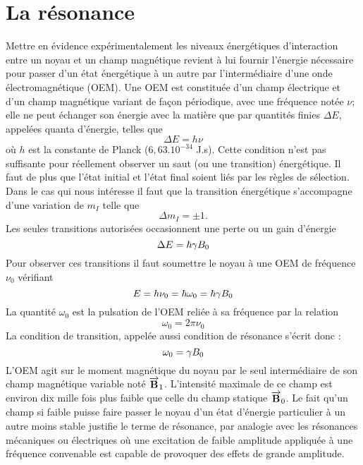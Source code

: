 \section{La résonance}
Mettre en évidence expérimentalement les niveaux énergétiques d'interaction
entre un noyau et un champ magnétique revient à lui fournir l'énergie nécessaire pour
passer d'un état énergétique à un autre par l'intermédiaire d'une onde
électromagnétique (OEM).
Une OEM est constituée d'un champ électrique et d'un champ magnétique
variant de façon périodique, avec une fréquence notée $\nu$; elle ne peut échanger son
énergie avec la matière que par quantités finies $\Delta E$, appelées quanta
d'énergie, telles que
\begin{equation}
\Delta E = h \nu
\end{equation}
où $h$ est la constante de Planck ($6,63.10^{-34}$ J.s).
Cette condition n'est pas suffisante pour
réellement observer un saut (ou une transition) énergétique.
Il faut de plus que l'état initial et l'état final soient liés par les règles
de sélection.
Dans le cas qui nous intéresse il
faut que la transition énergétique s'accompagne d'une variation de $m_I$
telle que
\begin{equation}
\Delta m_I = \pm 1.
\end{equation}
Les seules transitions autorisées occasionnent une perte ou un gain d'énergie
\begin{equation}
\Delta E = \hbar \gamma B_0
\end{equation}
Pour observer ces
transitions il faut soumettre le noyau à une OEM de fréquence $\nu_0$ vérifiant
\begin{equation}
E = h \nu_0 = \hbar \omega_0 = \hbar \gamma B_0
\end{equation}
La quantité $\omega_0$ est la pulsation de l'OEM reliée à sa fréquence par
la relation
\begin{equation}
\omega_0 = 2 \pi \nu_0
\end{equation}
La condition de transition, appelée aussi condition de résonance s'écrit donc :
\begin{equation}
\label{equbase}
\omega_0 = \gamma B_0
\end{equation}
L'OEM agit sur le moment magnétique du noyau par le seul intermédiaire de son
champ magnétique variable noté $\overrightarrow{\mathbf{B}}_1$.
L'intensité maximale de ce champ est environ dix mille
fois plus faible que celle du champ statique $\overrightarrow{\mathbf{B}}_0$.
Le fait qu'un champ si faible puisse faire passer le
noyau d'un état d'énergie particulier à un autre moins stable justifie le terme de
résonance, par analogie avec les résonances mécaniques ou électriques
où une excitation de faible amplitude appliquée à une fréquence convenable
est capable de provoquer des effets de grande amplitude.

